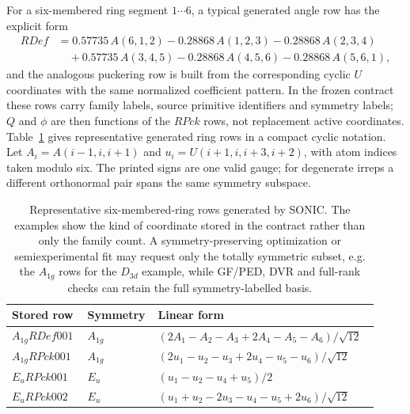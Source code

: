\documentclass[journal=jctcce,manuscript=article,layout=traditional]{achemso}
\newcommand{\SONIC}{SONIC}
\theoremstyle{definition}
\begin{document}
For a six-membered ring segment \(1\cdots6\), a typical generated angle row has
the explicit form
\begin{equation}
\label{eq:explicit-ring-rdef}
\begin{aligned}
RDef &=
 0.57735\,A(6,1,2)-0.28868\,A(1,2,3)-0.28868\,A(2,3,4) \\
&\quad +0.57735\,A(3,4,5)-0.28868\,A(4,5,6)-0.28868\,A(5,6,1),
\end{aligned}
\end{equation}
and the analogous puckering row is built from the corresponding cyclic
\(U\) coordinates with the same normalized coefficient pattern.  In the frozen
contract these rows carry family labels, source primitive identifiers and
symmetry labels; \(Q\) and \(\phi\) are then functions of the \(RPck\) rows, not
replacement active coordinates.
Table~\ref{tab:ring-coordinate-examples} gives representative generated ring
rows in a compact cyclic notation.  Let
\(A_i=A(i-1,i,i+1)\) and
\(u_i=U(i+1,i,i+3,i+2)\), with atom indices taken
modulo six.  The printed signs are one valid gauge; for degenerate irreps a
different orthonormal pair spans the same symmetry subspace.

\begin{table}[htbp]
\centering
\small
\caption{Representative six-membered-ring rows generated by \SONIC.  The
examples show the kind of coordinate stored in the contract rather than only
the family count.  A symmetry-preserving optimization or semiexperimental fit
may request only the totally symmetric subset, e.g. the \(A_{1g}\) rows for the
\(D_{3d}\) example, while GF/PED, DVR and full-rank checks can retain the full
symmetry-labelled basis.}
\label{tab:ring-coordinate-examples}
\begin{tabular}{@{}p{0.20\linewidth}p{0.14\linewidth}p{0.58\linewidth}@{}}
\toprule
Stored row & Symmetry & Linear form \\
\midrule
\(A_{1g}RDef001\) & \(A_{1g}\) &
\(\left(2A_1-A_2-A_3+2A_4-A_5-A_6\right)/\sqrt{12}\) \\
\midrule
\(A_{1g}RPck001\) & \(A_{1g}\) &
\(\left(2u_1-u_2-u_3+2u_4-u_5-u_6\right)/\sqrt{12}\) \\
\midrule
\(E_uRPck001\) & \(E_u\) &
\(\left(u_1-u_2-u_4+u_5\right)/2\) \\
\midrule
\(E_uRPck002\) & \(E_u\) &
\(\left(u_1+u_2-2u_3-u_4-u_5+2u_6\right)/\sqrt{12}\) \\
\bottomrule
\end{tabular}
\end{table}
\end{document}

